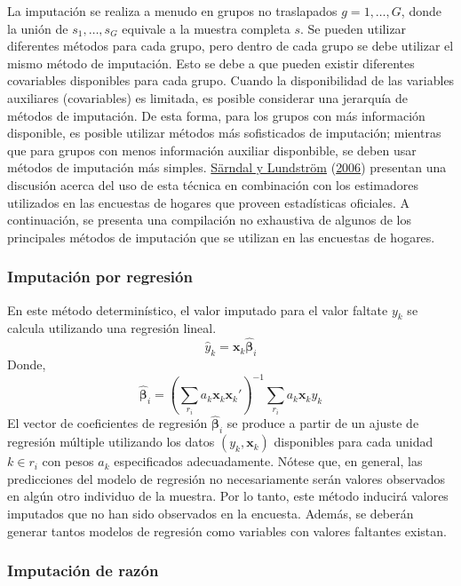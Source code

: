 \documentclass[
  12pt,
  spanish,
]{book}
\begin{document}
La imputación se realiza a menudo en grupos no traslapados \(g= 1, \ldots, G\), donde la unión de \(s_1, \ldots, s_G\) equivale a la muestra completa \(s\). Se pueden utilizar diferentes métodos para cada grupo, pero dentro de cada grupo se debe utilizar el mismo método de imputación. Esto se debe a que pueden existir diferentes covariables disponibles para cada grupo. Cuando la disponibilidad de las variables auxiliares (covariables) es limitada, es posible considerar una jerarquía de métodos de imputación. De esta forma, para los grupos con más información disponible, es posible utilizar métodos más sofisticados de imputación; mientras que para grupos con menos información auxiliar disponbible, se deben usar métodos de imputación más simples. \protect\hyperlink{ref-Sarndal_Lundstrom_2006}{Särndal y Lundström} (\protect\hyperlink{ref-Sarndal_Lundstrom_2006}{2006}) presentan una discusión acerca del uso de esta técnica en combinación con los estimadores utilizados en las encuestas de hogares que proveen estadísticas oficiales. A continuación, se presenta una compilación no exhaustiva de algunos de los principales métodos de imputación que se utilizan en las encuestas de hogares.

\hypertarget{imputaciuxf3n-por-regresiuxf3n}{%
\subsubsection*{Imputación por regresión}\label{imputaciuxf3n-por-regresiuxf3n}}

En este método determinístico, el valor imputado para el valor faltate \(y_k\) se calcula utilizando una regresión lineal.
\[\hat{y}_k = \mathbf{x}_k \hat{\boldsymbol{\beta}}_i\]
Donde,
\[
\hat{\boldsymbol{\beta}}_i = (\sum_{r_i} a_k\mathbf{x}_k\mathbf{x}_k')^{-1}
\sum_{r_i} a_k\mathbf{x}_ky_k
\]
El vector de coeficientes de regresión \(\hat{\boldsymbol{\beta}}_i\) se produce a partir de un ajuste de regresión múltiple utilizando los datos \((y_k, \mathbf{x}_k)\) disponibles para cada unidad \(k \in r_i\) con pesos \(a_k\) especificados adecuadamente. Nótese que, en general, las predicciones del modelo de regresión no necesariamente serán valores observados en algún otro individuo de la muestra. Por lo tanto, este método inducirá valores imputados que no han sido observados en la encuesta. Además, se deberán generar tantos modelos de regresión como variables con valores faltantes existan.

\hypertarget{imputaciuxf3n-de-razuxf3n}{%
\subsubsection*{Imputación de razón}\label{imputaciuxf3n-de-razuxf3n}}
\end{document}
